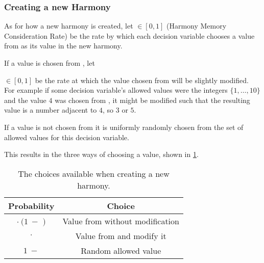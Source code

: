 \subsubsection{Creating a new Harmony}

As for how a new harmony is created, let \hmcr{} $\in [0,1]$ (Harmony Memory Consideration Rate) be the rate by which each decision variable chooses a value from \hm{} as its value in the new harmony.

If a value is chosen from \hm{}, let \par{} $\in [0,1]$ be the rate at which the value chosen from \hm{} will be slightly modified.
For example if some decision variable's allowed values were the integers $\{1, \dots, 10\}$ and the value $4$ was chosen from \hm{}, it might be modified such that the resulting value is a number adjacent to $4$, so $3$ or $5$.

If a value is not chosen from \hm{} it is uniformly randomly chosen from the set of allowed values for this decision variable.

This results in the three ways of choosing a value, shown in \cref{tab:04:hschoices}.

\begin{table}[t]
    \centering
    \begin{tabular}{|c|c|}\hline
        \textbf{Probability} & \textbf{Choice}\\ \hline
        \hmcr{} $\cdot\ (1\ -$ \parr{}$)$ & Value from \hm{} without modification\\\hline
        \hmcr{} $\cdot$ \parr{} & Value from \hm{} and modify it\\\hline
        $1\ -$ \hmcr{} & Random allowed value\\\hline 
    \end{tabular}
    \caption{The choices available when creating a new harmony.}
    \label{tab:04:hschoices}
\end{table}
